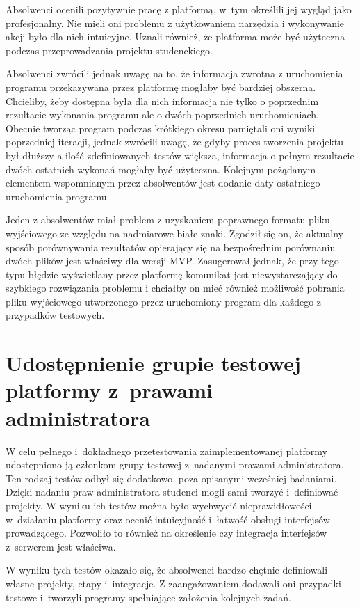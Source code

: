Absolwenci ocenili pozytywnie pracę z platformą, w~tym określili jej wygląd jako profesjonalny.
Nie mieli oni problemu z użytkowaniem narzędzia i wykonywanie akcji było dla nich intuicyjne.
Uznali również, że platforma może być użyteczna podczas przeprowadzania projektu studenckiego.

Absolwenci zwrócili jednak uwagę na to, że informacja zwrotna z uruchomienia programu przekazywana przez platformę mogłaby być bardziej obszerna.
Chcieliby, żeby dostępna była dla nich informacja nie tylko o poprzednim rezultacie wykonania programu ale o dwóch poprzednich uruchomieniach.
Obecnie tworząc program podczas krótkiego okresu pamiętali oni wyniki poprzedniej iteracji, jednak zwrócili uwagę, że gdyby proces tworzenia projektu był dłuższy a ilość zdefiniowanych testów większa, informacja o pełnym rezultacie dwóch ostatnich wykonań mogłaby być użyteczna.
Kolejnym pożądanym elementem wspomnianym przez absolwentów jest dodanie daty ostatniego uruchomienia programu.

Jeden z absolwentów miał problem z uzyskaniem poprawnego formatu pliku wyjściowego ze względu na nadmiarowe białe znaki.
Zgodził się on, że aktualny sposób porównywania rezultatów opierający się na bezpośrednim porównaniu dwóch plików jest właściwy dla wersji MVP.
Zasugerował jednak, że przy tego typu błędzie wyświetlany przez platformę komunikat jest niewystarczający do szybkiego rozwiązania problemu i chciałby on mieć również możliwość pobrania pliku wyjściowego utworzonego przez uruchomiony program dla każdego z przypadków testowych.


\section{Udostępnienie grupie testowej platformy z~prawami administratora}

W celu pełnego i~dokładnego przetestowania zaimplementowanej platformy udostępniono ją członkom grupy testowej z~nadanymi prawami administratora.
Ten rodzaj testów odbył się dodatkowo, poza opisanymi wcześniej badaniami.
Dzięki nadaniu praw administratora studenci mogli sami tworzyć i~definiować projekty.
W wyniku ich testów można było wychwycić nieprawidłowości w~działaniu platformy oraz ocenić intuicyjność i~łatwość obsługi interfejsów prowadzącego.
Pozwoliło to również na określenie czy integracja interfejsów z~serwerem jest właściwa.

W wyniku tych testów okazało się, że absolwenci bardzo chętnie definiowali własne projekty, etapy i~integracje.
Z zaangażowaniem dodawali oni przypadki testowe i~tworzyli programy spełniające założenia kolejnych zadań.


